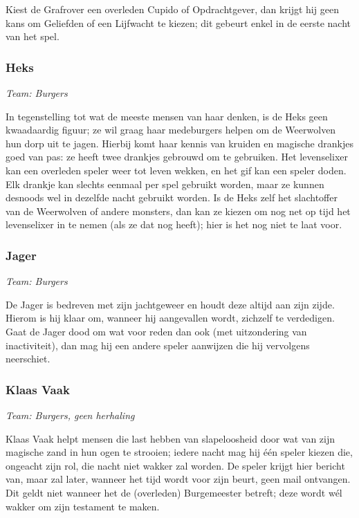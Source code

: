 \documentclass[12pt]{article}
\begin{document}
      Kiest de Grafrover een overleden Cupido of Opdrachtgever, dan krijgt hij geen kans om Geliefden of een Lijfwacht te kiezen; dit gebeurt enkel in de eerste nacht van het spel.
    
    \subsubsection{Heks}
      \emph{\scriptsize Team: Burgers}
    
      In tegenstelling tot wat de meeste mensen van haar denken, is de Heks geen kwaadaardig figuur; ze wil graag haar medeburgers helpen om de Weerwolven hun dorp uit te jagen. Hierbij komt haar kennis van kruiden en magische drankjes goed van pas: ze heeft twee drankjes gebrouwd om te gebruiken. Het levenselixer kan een overleden speler weer tot leven wekken, en het gif kan een speler doden. Elk drankje kan slechts eenmaal per spel gebruikt worden, maar ze kunnen desnoods wel in dezelfde nacht gebruikt worden. Is de Heks zelf het slachtoffer van de Weerwolven of andere monsters, dan kan ze kiezen om nog net op tijd het levenselixer in te nemen (als ze dat nog heeft); hier is het nog niet te laat voor.
    
    \subsubsection{Jager}
      \emph{\scriptsize Team: Burgers}
    
      De Jager is bedreven met zijn jachtgeweer en houdt deze altijd aan zijn zijde. Hierom is hij klaar om, wanneer hij aangevallen wordt, zichzelf te verdedigen. Gaat de Jager dood om wat voor reden dan ook (met uitzondering van inactiviteit), dan mag hij een andere speler aanwijzen die hij vervolgens neerschiet.
    
    \subsubsection{Klaas Vaak}
      \emph{\scriptsize Team: Burgers, geen herhaling}
    
      Klaas Vaak helpt mensen die last hebben van slapeloosheid door wat van zijn magische zand in hun ogen te strooien; iedere nacht mag hij \'e\'en speler kiezen die, ongeacht zijn rol, die nacht niet wakker zal worden. De speler krijgt hier bericht van, maar zal later, wanneer het tijd wordt voor zijn beurt, geen mail ontvangen. Dit geldt niet wanneer het de (overleden) Burgemeester betreft; deze wordt w\'el wakker om zijn testament te maken.
      
\end{document}
